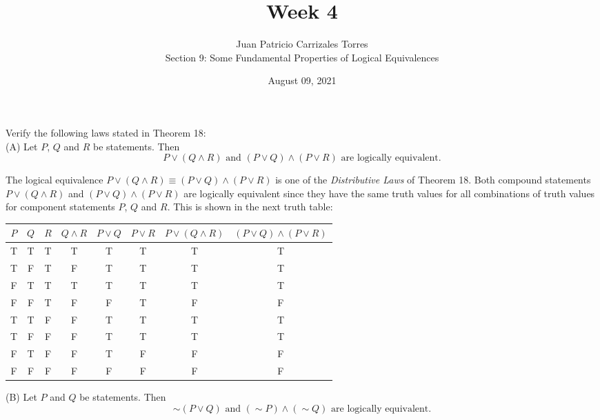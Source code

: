 \documentclass[12pt]{article}
\newenvironment{problem}[2][Problem]{\begin{trivlist}
		\item[\hskip \labelsep {\bfseries #1}\hskip \labelsep {\bfseries #2.}]}{\end{trivlist}}
\newenvironment{solution}[2][Solution]{\begin{trivlist}
		\item[\hskip \labelsep {\bfseries #1}\hskip \labelsep {\bfseries #2.}]}{\end{trivlist}}
\begin{document}
\title{Week 4}
\author{Juan Patricio Carrizales Torres \\
	Section 9: Some Fundamental Properties of Logical Equivalences}
\date{August 09, 2021}

\maketitle	

\begin{problem}{58}
	Verify the following laws stated in Theorem 18:\\
	
	(A) Let $P$, $Q$ and $R$ be statements. Then
	\begin{equation*}
		P \vee (Q \wedge R) \text{ and } (P \vee Q)\wedge (P \vee R) \text{ are logically equivalent.}
	\end{equation*}
	\begin{solution}{a}
		The logical equivalence $P \vee (Q \wedge R) \equiv (P \vee Q)\wedge (P \vee R)$ is one of the \textit{Distributive Laws} of Theorem 18. Both compound statements $P \vee (Q \wedge R)$ and $(P \vee Q)\wedge (P \vee R)$ are logically equivalent since they have the same truth values for all combinations of truth values for component statements $P$, $Q$ and $R$. This is shown in the next truth table:
		\begin{center}
			\begin{tabular}{c |c| c| c| c| c| c |c}
				$P$ & $Q$ & $R$ & $Q\wedge R$ & $P\vee Q$ & $P\vee R$ & $P \vee (Q \wedge R)$ & $(P \vee Q) \wedge (P \vee R)$\\
				\hline
				T & T & T & T & T & T & T & T\\
				T & F & T & F & T & T & T & T\\
				F & T & T & T & T & T & T & T\\
				F & F & T & F & F & T & F & F\\
				T & T & F & F & T & T & T & T\\
				T & F & F & F & T & T & T & T\\
				F & T & F & F & T & F & F & F\\
				F & F & F & F & F & F & F & F\\
				\hline
			\end{tabular}
		\end{center}
	\end{solution}
	(B) Let $P$ and $Q$ be statements. Then
	\begin{equation*}
		\sim (P\vee Q) \text{ and } (\sim P)\wedge (\sim Q) \text{ are logically equivalent.}

\end{equation*}
\end{problem}
\end{document}
